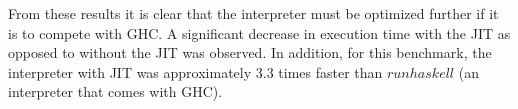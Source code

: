 From these results it is clear that the interpreter must be optimized further if
it is to compete with GHC. A significant decrease in execution time with the JIT
as opposed to without the JIT was observed. In addition, for this benchmark, the
interpreter with JIT was approximately $3.3$ times faster than $runhaskell$ 
(an interpreter that comes with GHC).




